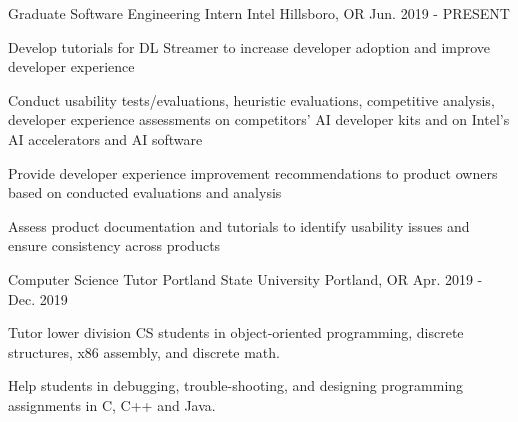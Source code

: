 
\begin{cventries}
  \cventry
    {Graduate Software Engineering Intern}
    {Intel}
    {Hillsboro, OR}
    {Jun. 2019 - PRESENT}
    {
      \begin{cvitems}
        \item {Develop tutorials for DL Streamer to increase developer adoption and improve developer experience}
        \item {Conduct usability tests/evaluations, heuristic evaluations, competitive analysis, developer experience assessments on competitors' AI developer kits and on Intel's AI accelerators and AI software}
        \item {Provide developer experience improvement recommendations to product owners based on conducted evaluations and analysis}
        \item {Assess product documentation and tutorials to identify usability issues and ensure consistency across products}
      \end{cvitems}
    }
  \cventry
    {Computer Science Tutor} %
    {Portland State University} %
    {Portland, OR} %
    {Apr. 2019 - Dec. 2019} %
    {
      \begin{cvitems} %
        \item {Tutor lower division CS students in object-oriented programming, discrete structures, x86 assembly, and discrete math.}
        \item {Help students in debugging, trouble-shooting, and designing programming assignments in C, C++ and Java.}
      \end{cvitems}
    }
\end{cventries}
